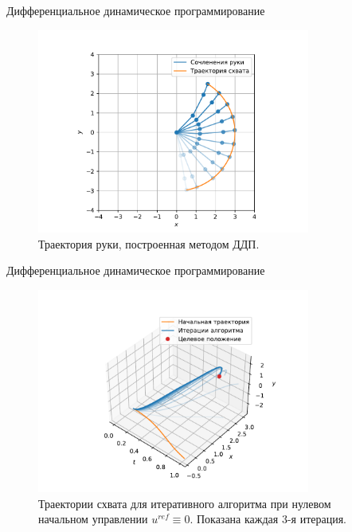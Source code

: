 \documentclass[16pt]{beamer}
\begin{document}
    \begin{frame}{Дифференциальное динамическое программирование}
        \begin{figure}
            \includegraphics[width=0.8\textwidth]{ddp_pendulum.pdf}
            \caption{Траектория руки, построенная методом ДДП.}
        \end{figure}
    \end{frame}

    \begin{frame}{Дифференциальное динамическое программирование}
        \begin{figure}
            \includegraphics[width=0.8\textwidth]{ddp_empty.pdf}
            \caption{Траектории схвата для итеративного алгоритма при нулевом начальном управлении $u^{ref}\equiv 0$. Показана каждая 3-я итерация.}
        \end{figure}
    \end{frame}
    
\end{document}
